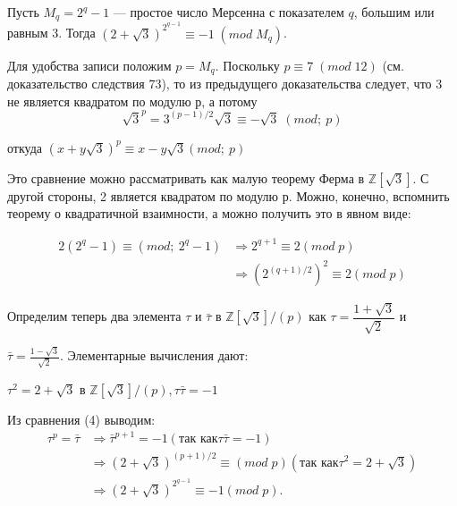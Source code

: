  	 \begin{sled}
 	 \noindent
 	 
 	 Пусть $M_q = 2^q - 1$ — простое число Мерсенна с показателем $q$, большим или равным 3. Тогда $(2+\sqrt{3})^{2^{q-1}} \equiv -1 \; (mod\;M_q)$.
 	 \end{sled}
 	 \begin{myproof}
 	 \noindent
 	 
 	 
 	 	
 	 	Для удобства записи положим $p = M_q$. Поскольку $p \equiv 7 \; (mod\;12)$ (см. доказательство следствия 73), то из предыдущего доказательства следует, что 3 не является квадратом по модулю $р$, а потому 
 	 	\begin{equation}
 	 	\sqrt{3}^p = 3^{(p-1)/2}\sqrt{3}\equiv -\sqrt{3} \;(mod;\ p)
 	 	\end{equation}
 	 	
 	 	\begin{center}
 	 		откуда $(x+y\sqrt{3})^p \equiv x- y\sqrt{3} (mod;\ p)$
 	 	\end{center}
  	    Это сравнение можно рассматривать как малую теорему Ферма в $\mathbb Z[\sqrt{3}]$. С другой стороны, 2 является квадратом по модулю $р$. Можно, конечно, вспомнить теорему о квадратичной взаимности, а можно получить это в явном виде:

 	 	\begin{equation}
 	 		\begin{split}
 	 			2(2^q-1) \equiv (mod ;\ 2^q-1) & \Rightarrow  2^{q+1} \equiv 2 (mod \; p) \\ 	
 	 			& \Rightarrow (2^{(q+1)/2})^2 \equiv 2 (mod \; p)
 	 		\end{split}
 	 	\end{equation}

 	 	Определим теперь два элемента $\tau$ и $\bar{\tau}$ в $\mathbb Z[\sqrt{3}]/(p)$ как $\tau = \dfrac{1+\sqrt{3}}{\sqrt{2}}$ и
 	 
 	 
 	 \pagebreak 
  	 
  	 
  	 	$\bar\tau = \frac{1-\sqrt{3}}{\sqrt{2}}$. Элементарные вычисления дают:
		\begin{center}
			$\tau^2 = 2 +\sqrt{3}$ в $\mathbb Z[\sqrt{3}]/(p), \tau\bar{\tau}=-1$
		\end{center}
		
		Из сравнения (4) выводим:
		\begin{equation}
		\begin{split}
		\tau^p=\bar{\tau} & \Rightarrow\bar{\tau}^{p+1}=-1 (\text{так как} \tau\bar{\tau}=-1) \\ &
		\Rightarrow (2+\sqrt{3})^{(p+1)/2} \equiv (mod\;p) (\text{так как} \tau^2 = 2+\sqrt{3}) \\ &		
		\Rightarrow (2+\sqrt{3})^{2^{q-1}} \equiv -1 (mod\;p).
		\end{split} 
		\end{equation}
  	 \end{myproof}	
   
